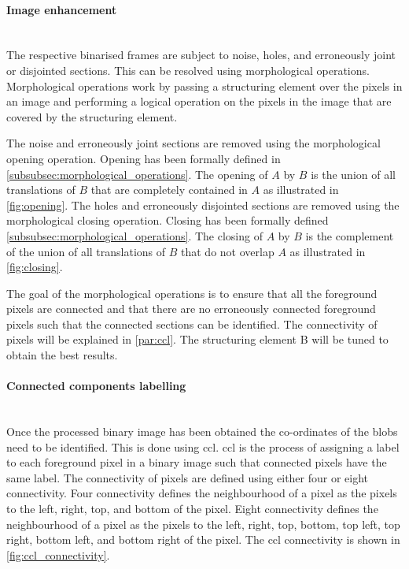 \paragraph{Image enhancement}\mbox{}\\
The respective binarised frames are subject to noise, holes, and erroneously joint or disjointed sections. This can be resolved using morphological operations. Morphological operations work by passing a structuring element over the pixels in an image and performing a logical operation on the pixels in the image that are covered by the structuring element.

The noise and erroneously joint sections are removed using the morphological opening operation. Opening has been formally defined in \autoref{subsubsec:morphological_operations}. The opening of $A$ by $B$ is the union of all translations of $B$ that are completely contained in $A$ as illustrated in \autoref{fig:opening}. The holes and erroneously disjointed sections are removed using the morphological closing operation. Closing has been formally defined \autoref{subsubsec:morphological_operations}. The closing of $A$ by $B$ is the complement of the union of all translations of $B$ that do not overlap $A$ as illustrated in \autoref{fig:closing}.

The goal of the morphological operations is to ensure that all the foreground pixels are connected and that there are no erroneously connected foreground pixels such that the connected sections can be identified. The connectivity of pixels will be explained in \autoref{par:ccl}. The structuring element B will be tuned to obtain the best results.


\paragraph{Connected components labelling}\label{par:ccl}\mbox{}\\
Once the processed binary image has been obtained the co-ordinates of the blobs need to be identified. This is done using \gls{ccl}. \Gls{ccl} is the process of assigning a label to each foreground pixel in a binary image such that connected pixels have the same label. The connectivity of pixels are defined using either four or eight connectivity. Four connectivity defines the neighbourhood of a pixel as the pixels to the left, right, top, and bottom of the pixel. Eight connectivity defines the neighbourhood of a pixel as the pixels to the left, right, top, bottom, top left, top right, bottom left, and bottom right of the pixel. The \gls{ccl} connectivity is shown in \autoref{fig:ccl_connectivity}.

